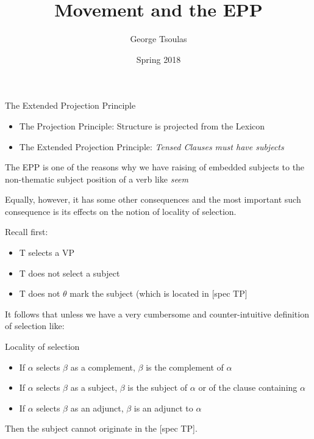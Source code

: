 


\title{Movement and the EPP}
\date{Spring 2018}
\author{George Tsoulas}


\maketitle

\begin{frame}
  {The Extended Projection Principle}

  \begin{itemize}
  \item The Projection Principle:  Structure is projected from the Lexicon
  \item The Extended Projection Principle:  \textit{Tensed Clauses must have subjects}
  \end{itemize}

\end{frame}


\begin{frame}
  The EPP is one of the reasons why we have raising of embedded subjects to the non-thematic subject position of a verb like \textit{seem}


Equally, however, it has some other consequences and the most important such consequence is its effects on the notion of locality of selection.


\end{frame}

\begin{frame}
  Recall first:
  \begin{itemize}
  \item T selects a VP
  \item T does not select a subject
  \item T does not $\theta$ mark the subject (which is located in [spec TP]
  \end{itemize}

\end{frame}

\begin{frame}


It follows that unless we have a very cumbersome and counter-intuitive definition of selection like:

\begin{block}
  {Locality of selection}
  \begin{itemize}
  \item If $\alpha$ selects $\beta$ as a complement, $\beta$ is the complement of $\alpha$
  \item If $\alpha$ selects $\beta$ as a subject, $\beta$ is the subject of $\alpha$ or of the clause containing $\alpha$
  \item If $\alpha$ selects $\beta$ as an adjunct, $\beta$ is an adjunct to $\alpha$
  \end{itemize}
\end{block}

Then the subject cannot originate in the [spec TP].


\end{frame}

